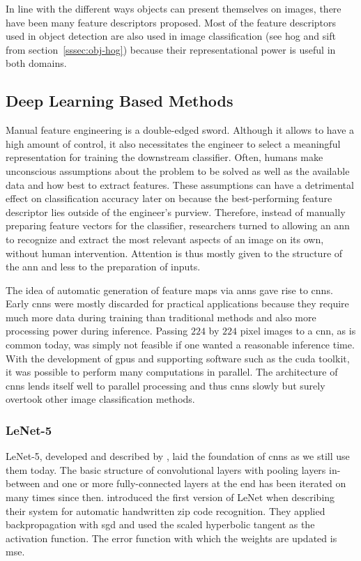\documentclass[final]{vutinfth} %
\begin{document}
In line with the different ways objects can present themselves on
images, there have been many feature descriptors proposed. Most of the
feature descriptors used in object detection are also used in image
classification (see \gls{hog} and \gls{sift} from
section~\ref{sssec:obj-hog}) because their representational power is
useful in both domains.

\subsection{Deep Learning Based Methods}
\label{ssec:class-dl}

Manual feature engineering is a double-edged sword. Although it allows
to have a high amount of control, it also necessitates the engineer to
select a meaningful representation for training the downstream
classifier. Often, humans make unconscious assumptions about the
problem to be solved as well as the available data and how best to
extract features. These assumptions can have a detrimental effect on
classification accuracy later on because the best-performing feature
descriptor lies outside of the engineer's purview. Therefore, instead
of manually preparing feature vectors for the classifier, researchers
turned to allowing an \gls{ann} to recognize and extract the most
relevant aspects of an image on its own, without human
intervention. Attention is thus mostly given to the structure of the
\gls{ann} and less to the preparation of inputs.

The idea of automatic generation of feature maps via \glspl{ann} gave
rise to \glspl{cnn}. Early \glspl{cnn} \cite{lecun1989} were mostly
discarded for practical applications because they require much more
data during training than traditional methods and also more processing
power during inference. Passing $224$ by $224$ pixel images to a
\gls{cnn}, as is common today, was simply not feasible if one wanted a
reasonable inference time. With the development of \glspl{gpu} and
supporting software such as the \gls{cuda} toolkit, it was possible to
perform many computations in parallel. The architecture of \glspl{cnn}
lends itself well to parallel processing and thus \glspl{cnn} slowly
but surely overtook other image classification methods.

\subsubsection{LeNet-5}
\label{sssec:theory-lenet-5}

LeNet-5, developed and described by \textcite{lecun1998}, laid the
foundation of \glspl{cnn} as we still use them today. The basic
structure of convolutional layers with pooling layers in-between and
one or more fully-connected layers at the end has been iterated on
many times since then. \textcite{lecun1989} introduced the first
version of LeNet when describing their system for automatic
handwritten zip code recognition. They applied backpropagation with
\gls{sgd} and used the scaled hyperbolic tangent as the activation
function. The error function with which the weights are updated is
\gls{mse}.
\end{document}
